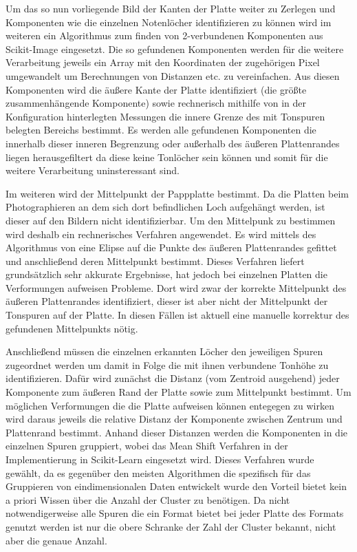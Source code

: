 Um das so nun vorliegende Bild der Kanten der Platte weiter zu Zerlegen und Komponenten wie die einzelnen Notenlöcher identifizieren zu können wird im weiteren ein Algorithmus zum finden von 2-verbundenen Komponenten aus Scikit-Image \parencite[]{scikit-image} eingesetzt.
Die so gefundenen Komponenten werden für die weitere Verarbeitung jeweils ein Array mit den Koordinaten der zugehörigen Pixel umgewandelt um Berechnungen von Distanzen etc. zu vereinfachen.
Aus diesen Komponenten wird die äußere Kante der Platte identifiziert (die größte zusammenhängende Komponente) sowie rechnerisch mithilfe von in der Konfiguration hinterlegten Messungen die innere Grenze des mit Tonspuren belegten Bereichs bestimmt.
Es werden alle gefundenen Komponenten die innerhalb dieser inneren Begrenzung oder außerhalb des äußeren Plattenrandes liegen herausgefiltert da diese keine Tonlöcher sein können und somit für die weitere Verarbeitung uninsteressant sind.

Im weiteren wird der Mittelpunkt der Pappplatte bestimmt.
Da die Platten beim Photographieren an dem sich dort befindlichen Loch aufgehängt werden, ist dieser auf den Bildern nicht identifizierbar.
Um den Mittelpunk zu bestimmen wird deshalb ein rechnerisches Verfahren angewendet.
Es wird mittels des Algorithmus von \textcite[]{halir1998numerically} eine Elipse auf die Punkte des äußeren Plattenrandes gefittet und anschließend deren Mittelpunkt bestimmt.
Dieses Verfahren liefert grundsätzlich sehr akkurate Ergebnisse, hat jedoch bei einzelnen Platten die Verformungen aufweisen Probleme.
Dort wird zwar der korrekte Mittelpunkt des äußeren Plattenrandes identifiziert, dieser ist aber nicht der Mittelpunkt der Tonspuren auf der Platte.
In diesen Fällen ist aktuell eine manuelle korrektur des gefundenen Mittelpunkts nötig.

Anschließend müssen die einzelnen erkannten Löcher den jeweiligen Spuren zugeordnet werden um damit in Folge die mit ihnen verbundene Tonhöhe zu identifizieren.
Dafür wird zunächst die Distanz (vom Zentroid ausgehend) jeder Komponente zum äußeren Rand der Platte sowie zum Mittelpunkt bestimmt.
Um möglichen Verformungen die die Platte aufweisen können entegegen zu wirken wird daraus jeweils die relative Distanz der Komponente zwischen Zentrum und Plattenrand bestimmt.
Anhand dieser Distanzen werden die Komponenten in die einzelnen Spuren gruppiert, wobei das Mean Shift Verfahren \parencite[]{meanshift} in der Implementierung in Scikit-Learn \parencite[]{scikit-learn} eingesetzt wird.
Dieses Verfahren wurde gewählt, da es gegenüber den meisten Algorithmen die spezifisch für das Gruppieren von eindimensionalen Daten entwickelt wurde den Vorteil bietet kein a priori Wissen über die Anzahl der Cluster zu benötigen.
Da nicht notwendigerweise alle Spuren die ein Format bietet bei jeder Platte des Formats genutzt werden ist nur die obere Schranke der Zahl der Cluster bekannt, nicht aber die genaue Anzahl.

